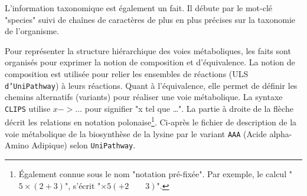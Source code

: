 \begin{refsegment}
L'information taxonomique est également un fait. Il débute par le mot-clé "species" suivi de chaînes de caractères de plus en plus précises sur la taxonomie de l'organisme.


Pour représenter la structure hiérarchique des voies métaboliques, les faits sont organisés pour exprimer la notion de composition et d'équivalence. La notion de composition est utilisée pour relier les ensembles de réactions (\gls{ULS} \texttt{d’UniPathway}) à leurs réactions. Quant à l'équivalence, elle permet de définir les chemins alternatifs (variants) pour réaliser une voie métabolique. La syntaxe \texttt{\gls{CLIPS}} utilise $x -> \ldots$ pour signifier "x tel que \ldots". La partie à droite de la flèche décrit les relations en notation polonaise\footnote{Également connue sous le nom "notation pré-fixée". Par exemple, le calcul "$5 \times (2 + 3)$", s'écrit "$\times 5 (+ 2 \qquad 3)$". }. Ci-après le fichier de description de la voie métabolique de la biosynthèse de la lysine par le variant \texttt{AAA} (Acide alpha-Amino Adipique) selon \texttt{UniPathway}.


\end{refsegment}
